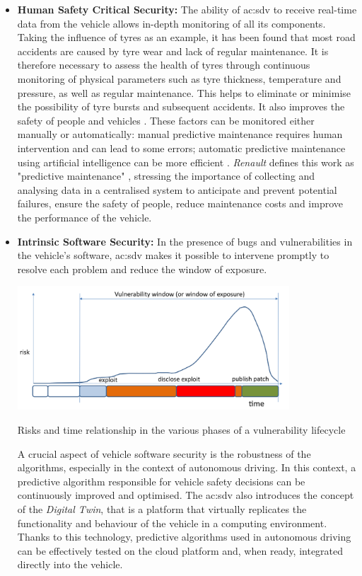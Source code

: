 \begin{itemize}
    \item \textbf{Human Safety Critical Security:} The ability of \gls{ac:sdv} to receive real-time data from the vehicle allows in-depth monitoring of all its components. Taking the influence of tyres as an example, it has been found that most road accidents are caused by tyre wear and lack of regular maintenance. It is therefore necessary to assess the health of tyres through continuous monitoring of physical parameters such as tyre thickness, temperature and pressure, as well as regular maintenance. This helps to eliminate or minimise the possibility of tyre bursts and subsequent accidents. It also improves the safety of people and vehicles \cite{PredictDefectsOfTiresInHeavyVehicle}. These factors can be monitored either manually or automatically: manual predictive maintenance requires human intervention and can lead to some errors; automatic predictive maintenance using artificial intelligence can be more efficient \cite{AirPressureSystemFailurePrediction}. \textit{Renault} defines this work as "predictive maintenance" \cite{SDVRenault}, stressing the importance of collecting and analysing data in a centralised system to anticipate and prevent potential failures, ensure the safety of people, reduce maintenance costs and improve the performance of the vehicle.
    \item \textbf{Intrinsic Software Security:} In the presence of bugs and vulnerabilities in the vehicle's software, \gls{ac:sdv} makes it possible to intervene promptly to resolve each problem and reduce the window of exposure.
    \begin{table}[h]  %
        \centering
        \includegraphics[width=0.8\textwidth]{images/window_of_exposure.png}  %
        \caption{Risks and time relationship in the various phases of a vulnerability lifecycle}
        \label{tab:WindowOfExposure}
    \end{table}

    A crucial aspect of vehicle software security is the robustness of the algorithms, especially in the context of autonomous driving. In this context, a predictive algorithm responsible for vehicle safety decisions can be continuously improved and optimised. The \gls{ac:sdv} also introduces the concept of the \textit{Digital Twin}, that is a platform that virtually replicates the functionality and behaviour of the vehicle in a computing environment. Thanks to this technology, predictive algorithms used in autonomous driving can be effectively tested on the cloud platform and, when ready, integrated directly into the vehicle.
\end{itemize}

